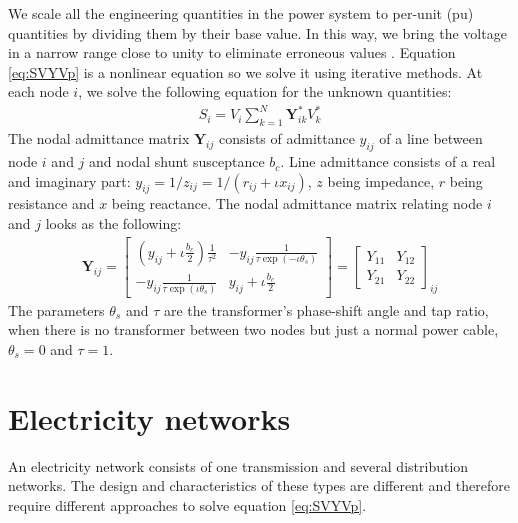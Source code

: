 \documentclass[10pt,journal]{article}
\begin{document}
We scale all the engineering quantities in the power system to per-unit (pu) quantities by dividing them by their base value. In this way, we bring the voltage in a narrow range close to unity to eliminate erroneous values \cite{Schavemaker2008chap6}. \newline
Equation \eqref{eq:SVYVp} is a nonlinear equation so we solve it using iterative methods. At each node $i$, we solve the following equation for the unknown quantities:
\begin{align}
       S_i=V_i\sum_{k=1}^N{\mathbf{Y}}^*_{ik}{V}^*_k \label{eq:SVI}
\end{align}
The nodal admittance matrix $\mathbf{Y}_{ij}$ consists of admittance $y_{ij}$ of a line between node $i$ and $j$ and nodal shunt susceptance $b_c$. Line admittance consists of a real and imaginary part: $y_{ij}= 1/z_{ij}= 1 / (r_{ij}+\iota x_{ij})$, $z$ being impedance, $r$ being resistance and $x$ being reactance.  The nodal admittance matrix relating node $i$ and $j$ looks as the following: 
\begin{align}\mathbf{Y}_{ij}= 
\begin{bmatrix}
(y_{ij}+\iota \frac{b_c}{2})\frac{1}{\tau^2} & -y_{ij}\frac{1}{\tau\exp{(-\iota\theta_s)}}\nonumber \\
-y_{ij}\frac{1}{\tau\exp{(\iota\theta_s)}}& y_{ij}+\iota \frac{b_c}{2}   
\end{bmatrix} = \begin{bmatrix} Y_{11} & Y_{12} \\ Y_{21} & Y_{22}
\end{bmatrix}_{ij}
\end{align}
The parameters $\theta_s$ and $\tau$ are the transformer's phase-shift angle and tap ratio, when there is no transformer between two nodes but just a normal power cable, $\theta_s=0$ and $\tau=1$. 

\section{Electricity networks}
An electricity network consists of one transmission and several distribution networks. The design and characteristics of these types are different and therefore require different approaches to solve equation \eqref{eq:SVYVp}.
\end{document}
